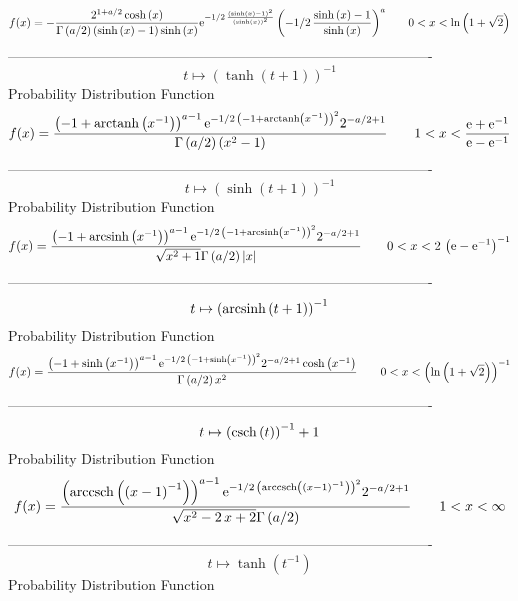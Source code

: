\documentclass[12pt]{article}
\begin{document}
$$  f(x)=-{\frac {{2}^{1+a/2}\cosh \left( x \right) }{\Gamma \left( a/2
 \right)  \left( \sinh \left( x \right) -1 \right) \sinh \left( x
 \right) }{{\rm e}^{-1/2\,{\frac { \left( \sinh \left( x \right) -1
 \right) ^{2}}{ \left( \sinh \left( x \right)  \right) ^{2}}}}}
 \left( -1/2\,{\frac {\sinh \left( x \right) -1}{\sinh \left( x
 \right) }} \right) ^{a}}
 \qquad0
 < x < \ln  \left( 1+\sqrt {2} \right) 
$$-------------------------------------------------------------------------------------------  \\$$t\mapsto  \left( \tanh \left( t+1 \right)  \right) ^{-1}
$$Probability Distribution Function 
$$  f(x)={\frac { \left( -1+{\rm arctanh} \left({x}^{-1}\right) \right) ^{a-1}{
{\rm e}^{-1/2\, \left( -1+{\rm arctanh} \left({x}^{-1}\right) \right) 
^{2}}}{2}^{-a/2+1}}{\Gamma \left( a/2 \right)  \left( {x}^{2}-1
 \right) }}
 \qquad1
 < x < {\frac {{\rm e}+{{\rm e}^{-1}}}{{\rm e}-{{\rm e}^{-1}}}}
$$-------------------------------------------------------------------------------------------  \\$$t\mapsto  \left( \sinh \left( t+1 \right)  \right) ^{-1}
$$Probability Distribution Function 
$$  f(x)={\frac { \left( -1+{\rm arcsinh} \left({x}^{-1}\right) \right) ^{a-1}{
{\rm e}^{-1/2\, \left( -1+{\rm arcsinh} \left({x}^{-1}\right) \right) 
^{2}}}{2}^{-a/2+1}}{\sqrt {{x}^{2}+1}\Gamma \left( a/2 \right) 
 \left| x \right| }}
 \qquad0
 < x < 2\, \left( {\rm e}-{{\rm e}^{-1}} \right) ^{-1}
$$-------------------------------------------------------------------------------------------  \\$$t\mapsto  \left( {\rm arcsinh} \left(t+1\right) \right) ^{-1}
$$Probability Distribution Function 
$$  f(x)={\frac { \left( -1+\sinh \left( {x}^{-1} \right)  \right) ^{a-1}{
{\rm e}^{-1/2\, \left( -1+\sinh \left( {x}^{-1} \right)  \right) ^{2}}
}{2}^{-a/2+1}\cosh \left( {x}^{-1} \right) }{\Gamma \left( a/2
 \right) {x}^{2}}}
 \qquad0
 < x <  \left( \ln  \left( 1+\sqrt {2} \right)  \right) ^{-1}
$$-------------------------------------------------------------------------------------------  \\$$t\mapsto  \left( {\rm csch} \left(t\right) \right) ^{-1}+1
$$Probability Distribution Function 
$$  f(x)={\frac { \left( {\rm arccsch} \left( \left( x-1 \right) ^{-1}\right)
 \right) ^{a-1}{{\rm e}^{-1/2\, \left( {\rm arccsch} \left( \left( x-1
 \right) ^{-1}\right) \right) ^{2}}}{2}^{-a/2+1}}{\sqrt {{x}^{2}-2\,x+
2}\Gamma \left( a/2 \right) }}
 \qquad1
 < x < \infty 
$$-------------------------------------------------------------------------------------------  \\$$t\mapsto \tanh \left( {t}^{-1} \right) 
$$Probability Distribution Function 
\end{document}

